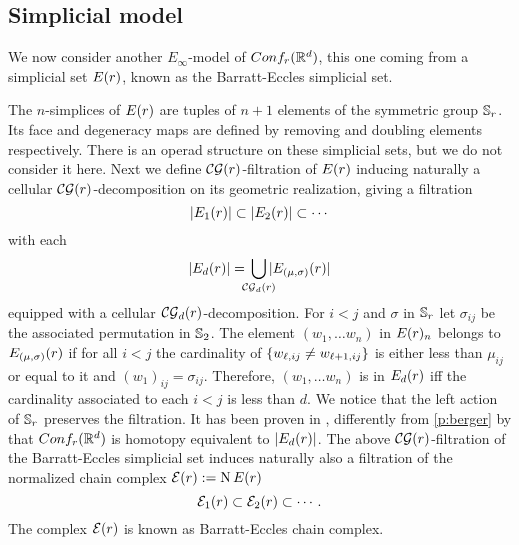 \subsection{Simplicial model}\label{ss:simplicial model}

We now consider another $E_\infty$-model of $Conf_{r}(\mathbb{R}^{d})$, this one coming from a simplicial set $E(r)$, known as the Barratt-Eccles simplicial set.


The $n$-simplices of $E(r)$ are tuples of $n+1$ elements of the symmetric group $\mathbb{S}_r$.
Its face and degeneracy maps are defined by removing and doubling elements respectively.
There is an operad structure on these simplicial sets, but we do not consider it here.
Next we define $\mathcal{CG}(r)$-filtration of $E(r)$ inducing naturally a cellular $\mathcal{CG}(r)$-decomposition on its geometric realization, giving a filtration
\[
\lvert E_1(r)\rvert \subset \lvert E_2(r)\rvert \subset \dotsb
\]
with each
\[
\bars{\BE_d(r)} = \,
\bigcup_{\mathclap{\CG_d(r)}} \,
\bars{\BE_{(\mu,\sigma)}(r)}
\]
equipped with a cellular $\mathcal{CG}_d(r)$-decomposition.
For $i<j$ and $\sigma$ in $\mathbb{S}_r$ let $\sigma_{ij}$ be the associated permutation in $\mathbb{S}_2$.
The element $(w_1,\dots w_n)$ in $E(r)_{n}$ belongs to $E_{(\mu,\sigma)}(r)$ if for all $i<j$ the cardinality of $\{w_{\ell,ij} \neq w_{\ell+1,ij}\}$ is either less than $\mu_{ij}$ or equal to it and $(w_1)_{ij} = \sigma_{ij}$.
Therefore, $(w_1,\dots w_n)$ is in $E_{d}(r)$ iff the cardinality associated to each $i<j$ is less than $d$.
We notice that the left action of $\mathbb{S}_r$ preserves the filtration. It has been proven in \cite{kashiwabara1993confcomplex}, differently from \cref{p:berger} by \cite{berger1997confspacemodel} that $Conf_{r}(\mathbb{R}^{d})$ is homotopy equivalent to $\lvert E_{d}(r)\rvert $.
The above $\mathcal{CG}(r)$-filtration of the Barratt-Eccles simplicial set induces naturally also a filtration of the normalized chain complex $\mathcal{E}(r):=\operatorname{N} E(r)$
\[
\mathcal{E}_{1}(r) \subset \mathcal{E}_{2}(r) \subset \dotsb \,.
\]
The complex $\mathcal{E}(r)$ is known as Barratt-Eccles chain complex.

